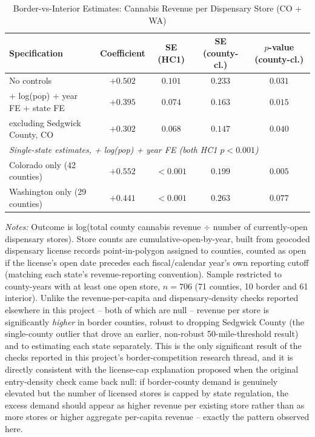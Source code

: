 \begin{table}[htbp]
\centering
\caption{Border-vs-Interior Estimates: Cannabis Revenue per Dispensary Store (CO + WA)}
\label{tab:revenue_perstore_border70}
\begin{tabular}{lcccc}
\toprule
Specification & Coefficient & SE (HC1) & SE (county-cl.) & $p$-value (county-cl.) \\
\midrule
No controls & $+0.502$ & $0.101$ & $0.233$ & $0.031$ \\
+ log(pop) + year FE + state FE & $+0.395$ & $0.074$ & $0.163$ & $0.015$ \\
\quad excluding Sedgwick County, CO & $+0.302$ & $0.068$ & $0.147$ & $0.040$ \\
\midrule
\multicolumn{5}{l}{\textit{Single-state estimates, + log(pop) + year FE (both HC1 $p<0.001$)}} \\
Colorado only (42 counties) & $+0.552$ & $<0.001$ & $0.199$ & $0.005$ \\
Washington only (29 counties) & $+0.441$ & $<0.001$ & $0.263$ & $0.077$ \\
\bottomrule
\end{tabular}
\begin{minipage}{0.95\textwidth}
\vspace{0.3em}
\footnotesize
\textit{Notes:} Outcome is log(total county cannabis revenue $\div$ number of currently-open dispensary
stores). Store counts are cumulative-open-by-year, built from geocoded dispensary license records
point-in-polygon assigned to counties, counted as open if the license's open date precedes each
fiscal/calendar year's own reporting cutoff (matching each state's revenue-reporting convention). Sample
restricted to county-years with at least one open store, $n=706$ (71 counties, 10 border and 61
interior). Unlike the revenue-per-capita and dispensary-density checks reported elsewhere in this
project -- both of which are null -- revenue per store is significantly \emph{higher} in border counties,
robust to dropping Sedgwick County (the single-county outlier that drove an earlier, non-robust
50-mile-threshold result) and to estimating each state separately. This is the only significant result
of the checks reported in this project's border-competition research thread, and it is directly
consistent with the license-cap explanation proposed when the original entry-density check came back null:
if border-county demand is genuinely elevated but the number of licensed stores is capped by state
regulation, the excess demand should appear as higher revenue per existing store rather than as more
stores or higher aggregate per-capita revenue -- exactly the pattern observed here.
\end{minipage}
\end{table}
